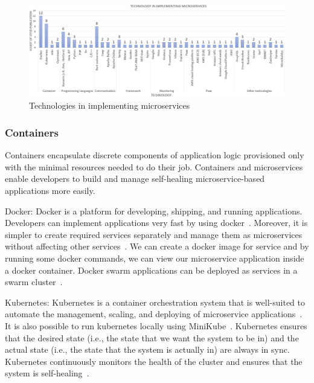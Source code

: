 \begin{figure}[t]
	\centering
	\includegraphics[width=\linewidth]{images/commontechupdated.png}
	\caption{Technologies in implementing microservices }
	\label{fig:tech-distinct}
\end{figure}


\subsubsection{Containers}
Containers encapsulate discrete components of application logic provisioned only with the minimal resources needed to do their job. Containers and microservices enable developers to build and manage self-healing microservice-based applications more easily.
 
\par Docker: Docker is a platform for developing, shipping, and running applications. Developers can implement applications very fast by using docker~\cite{Sharaf2019, Kristiani2020, khan2020}. Moreover, it is simpler to create required services separately and manage them as microservices without affecting other services~\cite{Leo2019, Hou2020, Kalske2017paper, Bahadori2018}. We can create a docker image for service and by running some docker commands, we can view our microservice application inside a docker container. Docker swarm applications can be deployed as services in a swarm cluster~\cite{Falatiuk2019, Venugopal2017, coulson2020}.
	
\par Kubernetes: Kubernetes is a container orchestration system that is well-suited to automate the management, scaling, and deploying of microservice applications~\cite{Zaytev2018, Kristiani2020, khan2020}. 
It is also possible to run kubernetes locally using MiniKube~\cite{Leo2019, Kalske2017paper}.
Kubernetes ensures that the desired state (i.e., the state that we want the system to be in) and the actual state (i.e., the state that the system is actually in) are always in sync. Kubernetes continuously monitors the health of the cluster and ensures that the system is self-healing~\cite{Bahadori2018, Falatiuk2019, Venugopal2017}.

